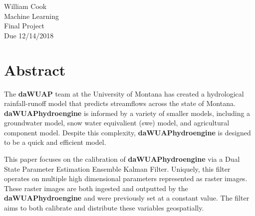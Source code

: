 \documentclass[12pt,twoside]{mitthesis}
\begin{document}
\pagestyle{plain}

\begin{flushright}
William Cook\\
Machine Learning\\
Final Project\\
Due 12/14/2018\\
\end{flushright}

\section{Abstract}

The \textbf{daWUAP} team at the University of Montana has created a hydrological rainfall-runoff model that predicts streamflows across the state of Montana. \textbf{daWUAPhydroengine} is informed by a variety of smaller models, including a groundwater model, snow water equivalient (swe) model, and agricultural component model. Despite this complexity, \textbf{daWUAPhydroengine} is designed to be a quick and efficient model.

This paper focuses on the calibration of \textbf{daWUAPhydroengine} via a Dual State Parameter Estimation Ensemble Kalman Filter. Uniquely, this filter operates on multiple high dimensional parameters represented as raster images. These raster images are both ingested and outputted by the \textbf{daWUAPhydroengine} and were previously set at a constant value. The filter aims to both calibrate and distribute these variables geospatially. 






\appendix

\end{document}
